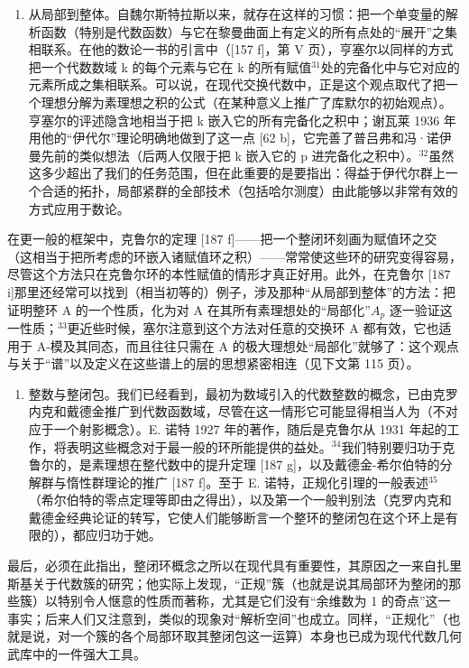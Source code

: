 \begin{enumerate}
\def\labelenumi{\Alph{enumi})}
\setcounter{enumi}{1}
\tightlist
\item
  从局部到整体。自魏尔斯特拉斯以来，就存在这样的习惯：把一个单变量的解析函数（特别是代数函数）与它在黎曼曲面上有定义的所有点处的“展开”之集相联系。在他的数论一书的引言中（{[}157 f{]}，第 V 页），亨塞尔以同样的方式把一个代数数域 k 的每个元素与它在 k 的所有赋值\(^{31}\)处的完备化中与它对应的元素所成之集相联系。可以说，在现代交换代数中，正是这个观点取代了把一个理想分解为素理想之积的公式（在某种意义上推广了库默尔的初始观点）。亨塞尔的评述隐含地相当于把 k 嵌入它的所有完备化之积中；谢瓦莱 1936 年用他的“伊代尔”理论明确地做到了这一点 {[}62 b{]}，它完善了普吕弗和冯·诺伊曼先前的类似想法（后两人仅限于把 k 嵌入它的 p 进完备化之积中）。\(^{32}\)虽然这多少超出了我们的任务范围，但在此重要的是要指出：得益于伊代尔群上一个合适的拓扑，局部紧群的全部技术（包括哈尔测度）由此能够以非常有效的方式应用于数论。
\end{enumerate}

在更一般的框架中，克鲁尔的定理 {[}187 f{]}——把一个整闭环刻画为赋值环之交（这相当于把所考虑的环嵌入诸赋值环之积）——常常使这些环的研究变得容易，尽管这个方法只在克鲁尔环的本性赋值的情形才真正好用。此外，在克鲁尔 {[}187 i{]}那里还经常可以找到（相当初等的）例子，涉及那种“从局部到整体”的方法：把证明整环 A 的一个性质，化为对 A 在其所有素理想处的“局部化”\(A_{p}\) 逐一验证这一性质；\(^{33}\)更近些时候，塞尔注意到这个方法对任意的交换环 A 都有效，它也适用于 A-模及其同态，而且往往只需在 A 的极大理想处“局部化”就够了：这个观点与关于“谱”以及定义在这些谱上的层的思想紧密相连（见下文第 115 页）。

\begin{enumerate}
\def\labelenumi{\Alph{enumi})}
\setcounter{enumi}{2}
\tightlist
\item
  整数与整闭包。我们已经看到，最初为数域引入的代数整数的概念，已由克罗内克和戴德金推广到代数函数域，尽管在这一情形它可能显得相当人为（不对应于一个射影概念）。E. 诺特 1927 年的著作，随后是克鲁尔从 1931 年起的工作，将表明这些概念对于最一般的环所能提供的益处。\(^{34}\)我们特别要归功于克鲁尔的，是素理想在整代数中的提升定理 {[}187 g{]}，以及戴德金-希尔伯特的分解群与惰性群理论的推广 {[}187 f{]}。至于 E. 诺特，正规化引理的一般表述\(^{35}\)（希尔伯特的零点定理等即由之得出），以及第一个一般判别法（克罗内克和戴德金经典论证的转写，它使人们能够断言一个整环的整闭包在这个环上是有限的），都应归功于她。
\end{enumerate}

最后，必须在此指出，整闭环概念之所以在现代具有重要性，其原因之一来自扎里斯基关于代数簇的研究；他实际上发现，“正规”簇（也就是说其局部环为整闭的那些簇）以特别令人惬意的性质而著称，尤其是它们没有“余维数为 1 的奇点”这一事实；后来人们又注意到，类似的现象对“解析空间”也成立。同样，“正规化”（也就是说，对一个簇的各个局部环取其整闭包这一运算）本身也已成为现代代数几何武库中的一件强大工具。

